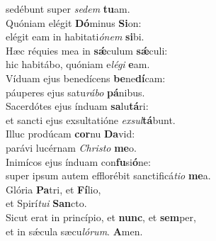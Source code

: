 \oddverse sedébunt super \textit{se}\textit{dem} \textbf{tu}am.\\
\evenverse Quóniam elégit \textbf{Dó}minus \textbf{Si}on:~\*\\
\evenverse elégit eam in habitati\textit{ó}\textit{nem} \textbf{si}bi.\\
\oddverse Hæc réquies mea in \textbf{sǽ}culum \textbf{sǽ}culi:~\*\\
\oddverse hic habitábo, quóniam e\textit{lé}\textit{gi} \textbf{e}am.\\
\evenverse Víduam ejus benedícens \textbf{be}ne\textbf{dí}cam:~\*\\
\evenverse páuperes ejus satu\textit{rá}\textit{bo} \textbf{pá}nibus.\\
\oddverse Sacerdótes ejus índuam \textbf{sa}lu\textbf{tá}ri:~\*\\
\oddverse et sancti ejus exsultatióne \textit{ex}\textit{sul}\textbf{tá}bunt.\\
\evenverse Illuc prodúcam \textbf{cor}nu \textbf{Da}vid:~\*\\
\evenverse parávi lucérnam \textit{Chri}\textit{sto} \textbf{me}o.\\
\oddverse Inimícos ejus índuam con\textbf{fu}si\textbf{ó}ne:~\*\\
\oddverse super ipsum autem efflorébit sanctificá\textit{ti}\textit{o} \textbf{me}a.\\
\evenverse Glória \textbf{Pa}tri, et \textbf{Fí}lio,~\*\\
\evenverse et Spirí\textit{tu}\textit{i} \textbf{San}cto.\\
\oddverse Sicut erat in princípio, et \textbf{nunc}, et \textbf{sem}per,~\*\\
\oddverse et in sǽcula sæcu\textit{ló}\textit{rum}. \textbf{A}men.\\
